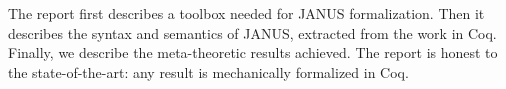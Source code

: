 The report first describes a toolbox needed for JANUS
formalization. Then it describes the syntax and semantics of JANUS,
extracted from the work in Coq. Finally, we describe the
meta-theoretic results achieved. The report is honest to the
state-of-the-art: any result is mechanically formalized in Coq.


